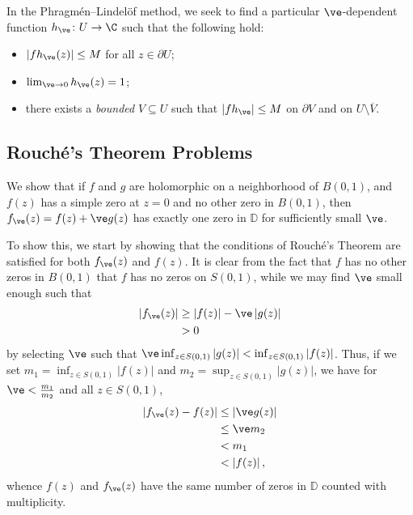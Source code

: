\documentclass[10pt]{mypackage}
\renewcommand{\D}{\mathbb{D}}
\begin{document}
In the Phragmén--Lindelöf method, we seek to find a particular $\ve$-dependent function $h_{\ve}\colon U\rightarrow \C$ such that the following hold:
\begin{itemize}
  \item $\left\vert fh_{\ve}(z) \right\vert \leq M$ for all $z\in \partial U$;
  \item $\lim_{\ve\rightarrow 0} h_{\ve}(z) = 1$;
  \item there exists a \textit{bounded} $V\subseteq U$ such that $\left\vert fh_{\ve} \right\vert\leq M$ on $\partial V$ and on $U\setminus \overline{V}$.
\end{itemize}
\subsection{Rouché's Theorem Problems}%
\begin{example}
  We show that if $f$ and $g$ are holomorphic on a neighborhood of $B\left( 0,1 \right)$, and $f(z)$ has a simple zero at $z = 0$ and no other zero in $B\left( 0,1 \right)$, then $f_{\ve}(z) = f(z) + \ve g(z)$ has exactly one zero in $\D$ for sufficiently small $\ve$.%

  To show this, we start by showing that the conditions of Rouché's Theorem are satisfied for both $f_{\ve}(z)$ and $f(z)$. It is clear from the fact that $f$ has no other zeros in $B\left( 0,1 \right)$ that $f$ has no zeros on $S\left( 0,1 \right)$, while we may find $\ve$ small enough such that
  \begin{align*}
    \left\vert f_{\ve}(z) \right\vert &\geq \left\vert f(z) \right\vert - \ve \left\vert g(z) \right\vert\\
                                      &> 0
  \end{align*}
  by selecting $\ve$ such that $\ve \inf_{z\in S\left( 0,1 \right)}\left\vert g(z) \right\vert < \inf_{z\in S\left( 0,1 \right)}\left\vert f(z) \right\vert$. Thus, if we set $m_1 = \inf_{z\in S\left( 0,1 \right)}\left\vert f(z) \right\vert$ and $m_2 = \sup_{z\in S\left( 0,1 \right)}\left\vert g(z) \right\vert$, we have for $\ve < \frac{m_1}{m_2}$ and all $z\in S\left( 0,1 \right)$,
  \begin{align*}
    \left\vert f_{\ve}(z) - f(z) \right\vert &\leq \left\vert \ve g(z) \right\vert\\
                                             &\leq \ve m_2\\
                                             &< m_1\\
                                             &< \left\vert f(z) \right\vert,
  \end{align*}
  whence $f(z)$ and $f_{\ve}(z)$ have the same number of zeros in $ \D $ counted with multiplicity.
\end{example}
\end{document}
